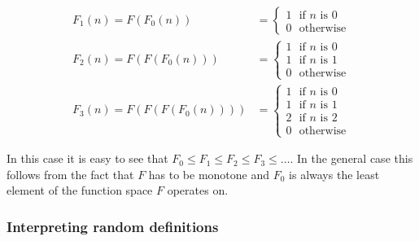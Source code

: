\documentclass[11pt, leqno]{article}
\theoremstyle{definition}
\begin{document}
\begin{align*}
  F_1(n) = F(F_0(n)) & = \begin{cases}
                           1~~~\text{if }n\text{ is 0}\\
                           0~~~\text{otherwise}
                         \end{cases}
  \\
  F_2(n) = F(F(F_0(n))) & = \begin{cases}
                             1~~~\text{if }n\text{ is 0}\\
                             1~~~\text{if }n\text{ is 1}\\
                             0~~~\text{otherwise}
                           \end{cases}
  \\
  F_3(n) = F(F(F(F_0(n)))) & = \begin{cases}
                                1~~~\text{if }n\text{ is 0}\\
                                1~~~\text{if }n\text{ is 1}\\
                                2~~~\text{if }n\text{ is 2}\\
                                0~~~\text{otherwise}
                              \end{cases}
\end{align*}

In this case it is easy to see that $F_0 \leq F_1 \leq F_2 \leq F_3 \leq \dots$. In
the general case this follows from the fact that $F$ has to be monotone and $F_0$ is
always the least element of the function space $F$ operates on. 


\subsubsection{Interpreting random definitions}\label{sec:random-interp}


\end{document}
